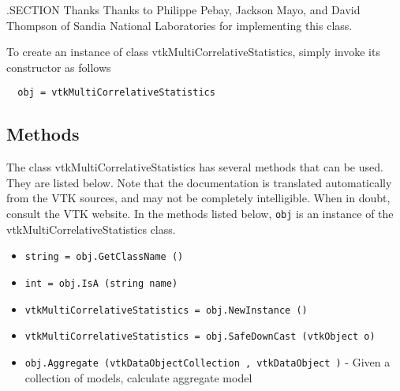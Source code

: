  .SECTION Thanks
 Thanks to Philippe Pebay, Jackson Mayo, and David Thompson of
 Sandia National Laboratories for implementing this class.

To create an instance of class vtkMultiCorrelativeStatistics, simply
invoke its constructor as follows
\begin{verbatim}
  obj = vtkMultiCorrelativeStatistics
\end{verbatim}
\subsection{Methods}

The class vtkMultiCorrelativeStatistics has several methods that can be used.
  They are listed below.
Note that the documentation is translated automatically from the VTK sources,
and may not be completely intelligible.  When in doubt, consult the VTK website.
In the methods listed below, \verb|obj| is an instance of the vtkMultiCorrelativeStatistics class.
\begin{itemize}
\item  \verb|string = obj.GetClassName ()|

\item  \verb|int = obj.IsA (string name)|

\item  \verb|vtkMultiCorrelativeStatistics = obj.NewInstance ()|

\item  \verb|vtkMultiCorrelativeStatistics = obj.SafeDownCast (vtkObject o)|

\item  \verb|obj.Aggregate (vtkDataObjectCollection , vtkDataObject )| -  Given a collection of models, calculate aggregate model

\end{itemize}
